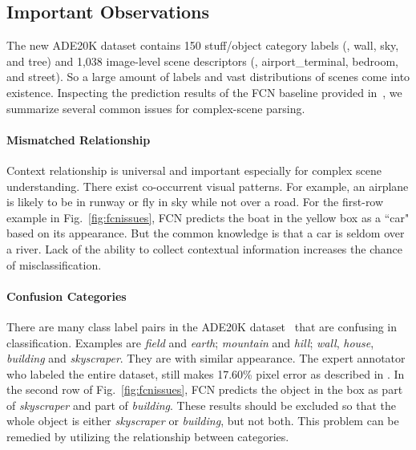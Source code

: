 \documentclass[10pt,twocolumn,letterpaper]{article}
\begin{document}
\subsection{Important Observations}

The new ADE20K dataset \cite{zhou2016semantic} contains 150 stuff/object category labels
(\eg, wall, sky, and tree) and 1,038 image-level scene descriptors (\eg,
airport\_terminal, bedroom, and street). So a large amount of labels and vast
distributions of scenes come into existence. Inspecting the prediction results of the FCN
baseline provided in~\cite{zhou2016semantic}, we summarize several common issues for
complex-scene parsing.

\vspace{-0.1in}
\paragraph{Mismatched Relationship} Context relationship is universal and
important especially for complex scene understanding. There exist co-occurrent visual
patterns. For example, an airplane is likely to be in runway or fly in sky while not over
a road. For the first-row example in Fig.~\ref{fig:fcnissues}, FCN predicts the boat in
the yellow box as a ``car" based on its appearance. But the common knowledge is that a
car is seldom over a river. Lack of the ability to collect contextual information
increases the chance of misclassification.

\vspace{-0.1in}
\paragraph{Confusion Categories}
There are many class label pairs in the ADE20K dataset~\cite{zhou2016semantic} that are
confusing in classification. Examples are {\it field} and {\it earth}; {\it mountain} and
{\it hill}; {\it wall}, {\it house}, {\it building} and {\it skyscraper}. They are with
similar appearance. The expert annotator who labeled the entire dataset, still makes
17.60\% pixel error as described in \cite{zhou2016semantic}. In the second row of
Fig.~\ref{fig:fcnissues}, FCN predicts the object in the box as part of {\it skyscraper}
and part of {\it building}. These results should be excluded so that the whole object is
either {\it skyscraper} or {\it building}, but not both. This problem can be remedied by
utilizing the relationship between categories.

\vspace{-0.1in}
\end{document}
